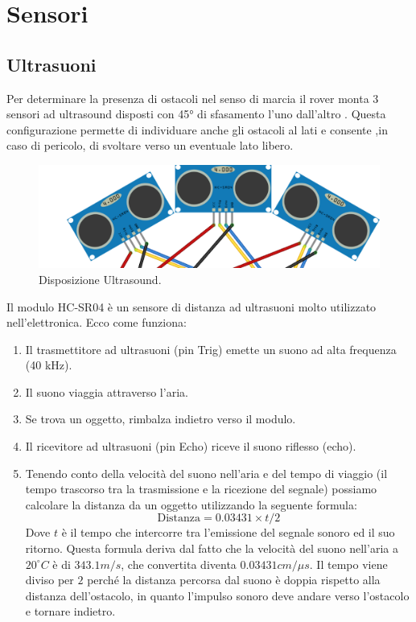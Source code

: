 \documentclass{article}
\begin{document}
\section{Sensori}
\subsection{Ultrasuoni}
Per determinare la presenza di ostacoli nel senso di marcia il rover monta 3 sensori ad ultrasound disposti con 45° di sfasamento l'uno dall'altro . Questa configurazione permette di individuare anche gli ostacoli al lati e consente ,in caso di pericolo, di svoltare verso un eventuale lato libero.
\begin{figure}[H]
\centering
\includegraphics[width=0.6\linewidth]{image/ultra.png}
\caption{\label{fig:ultra}Disposizione Ultrasound.}
\end{figure}
Il modulo HC-SR04 è un sensore di distanza ad ultrasuoni molto utilizzato nell'elettronica. Ecco come funziona:
\begin{enumerate}
\item  Il trasmettitore ad ultrasuoni (pin Trig) emette un suono ad alta frequenza (40 kHz).
\item Il suono viaggia attraverso l'aria.
\item Se trova un oggetto, rimbalza indietro verso il modulo.
\item Il ricevitore ad ultrasuoni (pin Echo) riceve il suono riflesso (echo).
\item Tenendo conto della velocità del suono nell'aria e del tempo di viaggio (il tempo trascorso tra la trasmissione e la ricezione del segnale) possiamo calcolare la distanza da un oggetto utilizzando la seguente formula:$$\text{Distanza} = 0.03431 \times t / 2$$
Dove $t$ è il tempo che intercorre tra l'emissione del segnale sonoro ed il suo ritorno. Questa formula deriva dal fatto che la velocità del suono nell'aria a \(20^\circ C\) è di \(343.1 m/s\), che convertita diventa \(0.03431 cm/\mu s\). Il tempo viene diviso per \(2\) perché la distanza percorsa dal suono è doppia rispetto alla distanza dell’ostacolo, in quanto l’impulso sonoro deve andare verso l’ostacolo e tornare indietro.

\end{enumerate}
\end{document}
